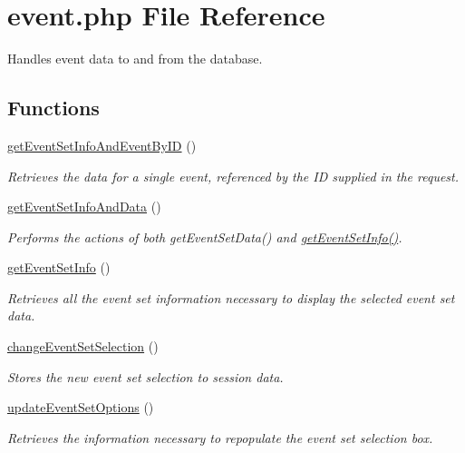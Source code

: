 \hypertarget{event_8php}{\section{event.\-php \-File \-Reference}
\label{event_8php}
}


\-Handles event data to and from the database.  


\subsection*{\-Functions}
\begin{DoxyCompactItemize}
\item 
\hyperlink{event_8php_a64e52607180419f5ac4ce6969f9a3725}{get\-Event\-Set\-Info\-And\-Event\-By\-I\-D} ()
\begin{DoxyCompactList}\small\item\em \-Retrieves the data for a single event, referenced by the \-I\-D supplied in the request. \end{DoxyCompactList}\item 
\hyperlink{event_8php_af3071b0c5bbd23339216eff1dd218349}{get\-Event\-Set\-Info\-And\-Data} ()
\begin{DoxyCompactList}\small\item\em \-Performs the actions of both get\-Event\-Set\-Data() and \hyperlink{event_8php_ac111287cb3782ef6b2b3a5c5333a0164}{get\-Event\-Set\-Info()}. \end{DoxyCompactList}\item 
\hyperlink{event_8php_ac111287cb3782ef6b2b3a5c5333a0164}{get\-Event\-Set\-Info} ()
\begin{DoxyCompactList}\small\item\em \-Retrieves all the event set information necessary to display the selected event set data. \end{DoxyCompactList}\item 
\hyperlink{event_8php_a13aad0d75556ac9ae9f50ee754bd36f5}{change\-Event\-Set\-Selection} ()
\begin{DoxyCompactList}\small\item\em \-Stores the new event set selection to session data. \end{DoxyCompactList}\item 
\hyperlink{event_8php_a93eabb06ba8025e80af7dde1341c758d}{update\-Event\-Set\-Options} ()
\begin{DoxyCompactList}\small\item\em \-Retrieves the information necessary to repopulate the event set selection box. \end{DoxyCompactList}\end{DoxyCompactItemize}


